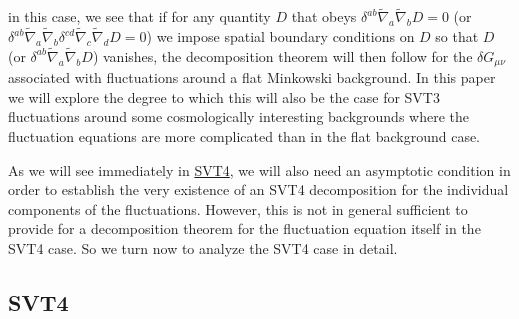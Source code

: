 %
in this case, we see that if for any quantity $D$ that obeys  $\delta^{ab} \tilde{\nabla}_{a}\tilde{\nabla}_{b}D=0$ (or $\delta^{ab} \tilde{\nabla}_{a}\tilde{\nabla}_{b}\delta^{cd} \tilde{\nabla}_{c}\tilde{\nabla}_{d}D=0$) we impose spatial boundary conditions on $D$ so that $D$ (or $\delta^{ab} \tilde{\nabla}_{a}\tilde{\nabla}_{b}D$) vanishes,  the decomposition theorem will then follow for the $\delta G_{\mu\nu}$ associated with fluctuations around a flat Minkowski background. In this paper we will explore the degree to which this will also be the case for SVT3 fluctuations around some cosmologically interesting backgrounds where the fluctuation equations are more complicated than in the flat background case.

As we will see immediately in \hyperref[s:svt4]{SVT4}, we will also need an asymptotic condition in order to establish the very existence of an SVT4 decomposition for the individual components of the fluctuations. However, this is not in general sufficient to provide for a decomposition theorem for the fluctuation equation itself in the SVT4 case. So we turn now to analyze the SVT4 case in detail. 



\subsection{SVT4}


